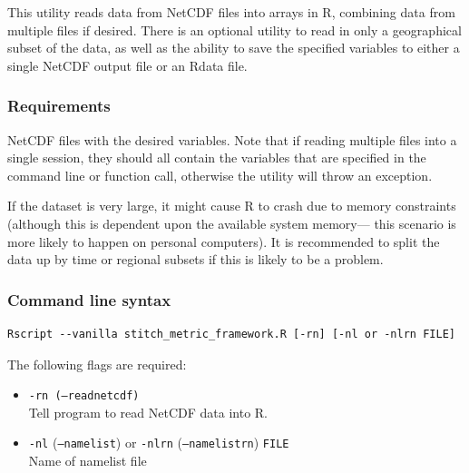 \documentclass{article}
\begin{document}
This utility reads data from NetCDF files into arrays in R, combining data from multiple files if desired. There is an optional utility to read in only a geographical subset of the data, as well as the ability to save the specified variables to either a single NetCDF output file or an Rdata file.

\subsubsection{Requirements}
NetCDF files with the desired variables. Note that if reading multiple files into a single session, they should all contain the variables that are specified in the command line or function call, otherwise the utility will throw an exception. 

If the dataset is very large, it might cause R to crash due to memory constraints (although this is dependent upon the available system memory--- this scenario is more likely to happen on personal computers). It is recommended to split the data up by time or regional subsets if this is likely to be a problem.

\subsubsection{Command line syntax}

\begin{verbatim}
Rscript --vanilla stitch_metric_framework.R [-rn] [-nl or -nlrn FILE]
\end{verbatim}

The following flags are required:

\begin{itemize}
\item[] \texttt{-rn (--readnetcdf)}\\Tell program to read NetCDF data into R.
\item[]\texttt{-nl} (\texttt{--namelist}) or \texttt{-nlrn} (\texttt{--namelistrn}) \texttt{FILE}\\ Name of namelist file
\end{itemize}
\end{document}

